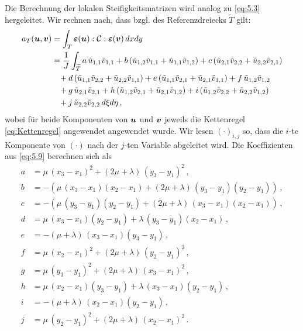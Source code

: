 Die Berechnung der lokalen Steifigkeitsmatrizen wird analog zu \eqref{eq:5.3} hergeleitet. Wir rechnen nach, dass bzgl. des Referenzdreiecks $\widetilde T$ gilt:
\begin{align}\notag
	a_T(\boldsymbol u, \boldsymbol v) & = \int_T \boldsymbol {\varepsilon}(\boldsymbol u) : \mathcal C : \boldsymbol {\varepsilon}(\boldsymbol v) \, dxdy \\
	\notag
	& = \frac 1 J \int_{\widetilde T} a \, \tilde u_{1,1} \tilde v_{1,1} + b \, (\tilde u_{1,2} \tilde v_{1,1} + \tilde u_{1,1} \tilde v_{1,2}) + c \, (\tilde u_{2,1} \tilde v_{2,2} + \tilde u_{2,2} \tilde v_{2,1}) \\ 
	& \ \ \, \notag + d \, (\tilde u_{1,1} \tilde v_{2,2}+\tilde u_{2,2} \tilde v_{1,1}) + e \, (\tilde u_{1,1} \tilde v_{2,1}+\tilde u_{2,1} \tilde v_{1,1}) + f \, \tilde u_{1,2} \tilde v_{1,2} \\
	\notag & \ \ \, + g \, \tilde u_{2,1} \tilde v_{2,1} + h\, (\tilde u_{1,2} \tilde v_{2,1} +\tilde u_{2,1} \tilde v_{1,2}) + i \, (\tilde u_{1,2} \tilde v_{2,2} + \tilde u_{2,2} \tilde v_{1,2}) \\
	& \ \ \, + j \, \tilde u_{2,2} \tilde v_{2,2} \, d\xi d\eta \, ,\label{eq:5.9}
\end{align}
wobei für beide Komponenten von $\boldsymbol u$ und $\boldsymbol v$ jeweils die Kettenregel \eqref{eq:Kettenregel} angewendet angewendet wurde. Wir lesen $(\cdot)_{i,j}$ so, dass die $i$-te Komponente von $(\cdot)$ nach der $j$-ten Variable abgeleitet wird. Die Koeffizienten aus \eqref{eq:5.9} berechnen sich als
\begin{align*}
	a &= \mu \, (x_3-x_1)^2 +(2\mu+\lambda) \, (y_3-y_1)^2 \, , \\
	b & = -(\mu \, (x_3-x_1)(x_2-x_1) + (2\mu+\lambda) \, (y_3-y_1)(y_2-y_1)) \, , \\
	c & = -(\mu \, (y_3-y_1)(y_2-y_1) + (2\mu+\lambda) \, (x_3-x_1)(x_2-x_1)) \, ,  \\
	d & = \mu \, (x_3-x_1)(y_2-y_1) + \lambda \, (y_3-y_1)(x_2-x_1) \, , \\
	e & = -(\mu+\lambda) \, (x_3-x_1)(y_3-y_1) \, , \\
	f & = \mu \, (x_2-x_1)^2 + (2\mu + \lambda) \, (y_2-y_1)^2 \, ,  \\
	g & = \mu \, (y_3-y_1)^2 + (2\mu + \lambda) \, (x_3-x_1)^2 \, ,  \\
	h & = \mu\, (x_2-x_1)(y_3-y_1) + \lambda\, (x_3-x_1)(y_2-y_1) \, , \\
	i & = -(\mu + \lambda) \, (x_2-x_1)(y_2-y_1) \, ,  \\
	j & = \mu \, (y_2-y_1)^2 + (2\mu +\lambda) \, (x_2-x_1)^2 \, .
\end{align*}
